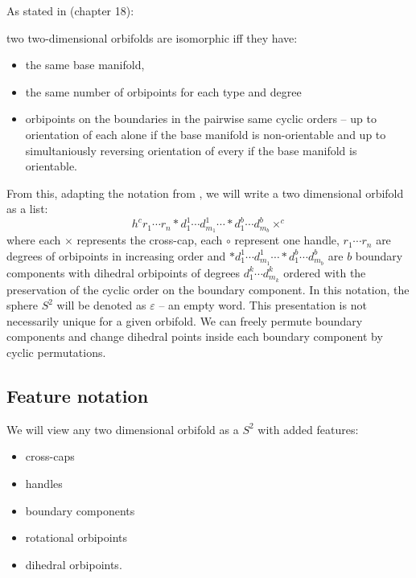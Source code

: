 As stated in \cite{Conway2016} (chapter 18): 
\begin{theorem}
two two-dimensional orbifolds are 
isomorphic iff they have:
\begin{itemize}\label{sameness}
\item the same base manifold, 
\item the same number of orbipoints for each type and degree 
\item orbipoints on the boundaries 
in the pairwise same cyclic orders -- up to orientation of each alone
if the base manifold is non-orientable  
and up to simultaniously reversing orientation of every if the base manifold is orientable.
\end{itemize}
\end{theorem}
From this, adapting the notation from \cite{Conway2016}, we will write 
a two dimensional 
orbifold as a list: 
\begin{equation}
h^cr_1\cdots r_n 
*d_1^1\cdots d_{m_1}^1 \cdots *d_1^b\cdots d_{m_b}^b\times^c
\end{equation}
where each $\times$ represents the cross-cap, 
each $\circ$ represent one handle, 
$r_1\cdots r_n$ are degrees of orbipoints in increasing order and 
$*d_1^1\cdots d_{m_1}^1 \cdots *d_1^b\cdots d_{m_b}^b$ are $b$ boundary components 
with dihedral orbipoints of degrees $d_1^k\cdots d_{m_k}^k$ ordered with the preservation 
of the cyclic order on the boundary component. 
In this notation, the sphere $S^2$ will be denoted as $\varepsilon$ -- an empty word.
This presentation is not necessarily unique for a given orbifold. We can freely permute 
boundary components and change dihedral points inside each boundary component by cyclic 
permutations. 
\subsection{Feature notation}
We will view any two dimensional orbifold as a $S^2$ with added features:
\begin{itemize}
\item cross-caps
\item handles
\item boundary components
\item rotational orbipoints
\item dihedral orbipoints.
\end{itemize}

